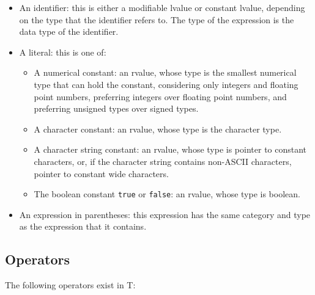 \documentclass[letterpaper,12pt]{book}
\begin{document}
\begin{itemize}
	\item An identifier: this is either a modifiable lvalue or constant lvalue, depending on the type that the identifier refers to. The type of the expression is the data type of the identifier.
	\item A literal: this is one of:
	\begin{itemize}
		\item A numerical constant: an rvalue, whose type is the smallest numerical type that can hold the constant, considering only integers and floating point numbers, preferring integers over floating point numbers, and preferring unsigned types over signed types.
		\item A character constant: an rvalue, whose type is the character type.
		\item A character string constant: an rvalue, whose type is pointer to constant characters, or, if the character string contains non-ASCII characters, pointer to constant wide characters.
		\item The boolean constant \texttt{true} or \texttt{false}: an rvalue, whose type is boolean.
	\end{itemize}
	\item An expression in parentheses: this expression has the same category and type as the expression that it contains.
\end{itemize}

\subsection{Operators}

The following operators exist in T:

\end{document}
